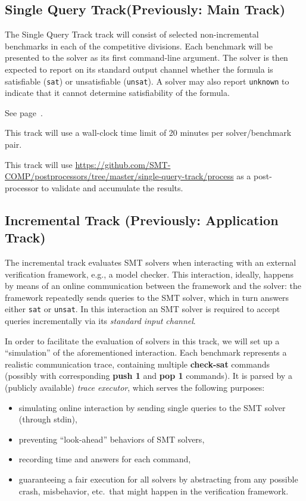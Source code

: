 \documentclass[12pt]{article}
\newcommand{\akey}[1]{\textbf{#1}\xspace}
\newcommand{\maintrack}{Single Query Track\xspace}
\begin{document}
\subsection{\maintrack (Previously: Main Track)}
\label{sec:exec:single}

The \maintrack track will consist of selected non-incremental benchmarks in
each of the competitive divisions.  Each benchmark will be presented to
the solver as its first command-line argument.  The solver is then expected to
report on its standard output channel whether the formula is satisfiable
(\texttt{sat}) or unsatisfiable (\texttt{unsat}).  A solver may also report
\texttt{unknown} to indicate that it cannot determine satisfiability of the
formula.

 See page~\pageref{benchmark-selection}.

This track will use a wall-clock time limit of 20 minutes per solver/benchmark
pair.

This track will use
{\url{https://github.com/SMT-COMP/postprocessors/tree/master/single-query-track/process}}
as a post-processor
to validate and accumulate the results.

\subsection{Incremental Track (Previously: Application Track)}
\label{sec:exec:app}

The incremental track evaluates SMT solvers when interacting with an
external verification framework, e.g., a model checker. This
interaction, ideally, happens by means of an online communication
between the framework and the solver: the framework repeatedly sends
queries to the SMT solver, which in turn answers either \texttt{sat}
or \texttt{unsat}.  In this interaction an SMT solver is required to
accept queries incrementally via its \emph{standard input channel}.

In order to facilitate the evaluation of solvers in this track, we will set up
a ``simulation'' of the aforementioned interaction.  Each benchmark represents
a realistic communication trace, containing multiple \akey{check-sat} commands
(possibly with corresponding \akey{push 1} and \akey{pop 1} commands). It is
parsed by a (publicly available) \emph{trace executor},
which serves the following purposes:

\begin{itemize}
  \item simulating online interaction by sending single queries to the SMT
    solver (through stdin),
  \item preventing ``look-ahead'' behaviors of SMT solvers,
  \item recording time and answers for each command,
  \item guaranteeing a fair execution for all solvers by abstracting
  from any possible crash, misbehavior, etc.\ that might happen in the
  verification framework.
\end{itemize}
\end{document}
